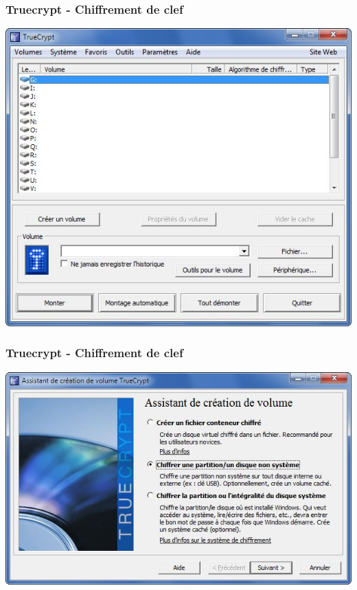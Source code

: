 \documentclass{beamer}
\begin{document}
\begin{frame}
\frametitle{Truecrypt - Chiffrement de clef}
\begin{center}
\includegraphics[scale=0.5] {./images/Truecrypt22.jpg} 
\end{center}
\end{frame}
\begin{frame}
\frametitle{Truecrypt - Chiffrement de clef}
\begin{center}
\includegraphics[scale=0.5] {./images/Truecrypt23.jpg} 
\end{center}
\end{frame}
\end{document}
